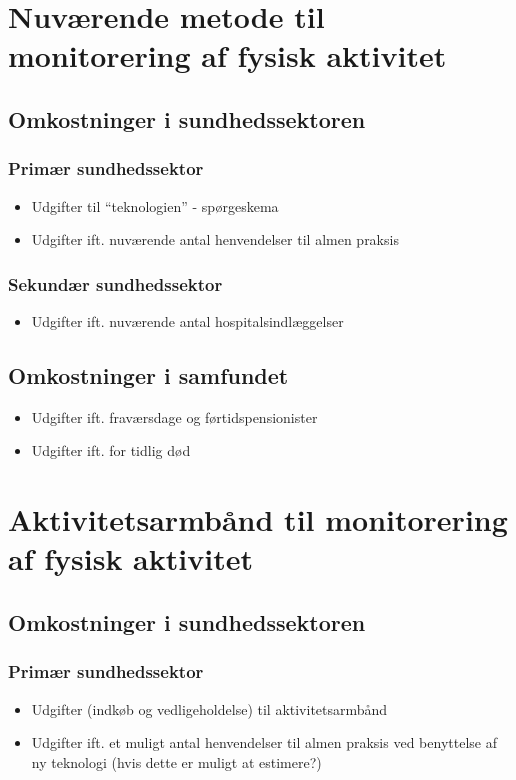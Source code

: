 \section{Nuværende metode til monitorering af fysisk aktivitet}
\subsection{Omkostninger i sundhedssektoren}
\subsubsection{Primær sundhedssektor}
\begin{itemize}
\item Udgifter til “teknologien” - spørgeskema
\item Udgifter ift. nuværende antal henvendelser til almen praksis
\end{itemize}
\subsubsection{Sekundær sundhedssektor}
\begin{itemize}
\item Udgifter ift. nuværende antal hospitalsindlæggelser
\end{itemize}
\subsection{Omkostninger i samfundet}
\begin{itemize}
\item Udgifter ift. fraværsdage og førtidspensionister
\item Udgifter ift. for tidlig død
\end{itemize}

\section{Aktivitetsarmbånd til monitorering af fysisk aktivitet}
\subsection{Omkostninger i sundhedssektoren}
\subsubsection{Primær sundhedssektor}
\begin{itemize}
\item  Udgifter (indkøb og vedligeholdelse) til aktivitetsarmbånd
\item Udgifter ift. et muligt antal henvendelser til almen praksis ved benyttelse af ny teknologi (hvis dette er muligt at estimere?)
\end{itemize}
